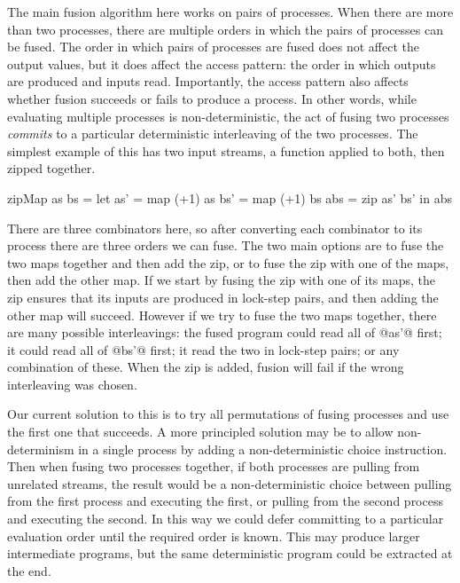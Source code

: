 The main fusion algorithm here works on pairs of processes.
When there are more than two processes, there are multiple orders in which the pairs of processes can be fused.
The order in which pairs of processes are fused does not affect the output values, but it does affect the access pattern: the order in which outputs are produced and inputs read.
Importantly, the access pattern also affects whether fusion succeeds or fails to produce a process.
In other words, while evaluating multiple processes is non-deterministic, the act of fusing two processes \emph{commits} to a particular deterministic interleaving of the two processes.
The simplest example of this has two input streams, a function applied to both, then zipped together. 

\begin{code}
zipMap as bs =
  let as' = map (+1) as
      bs' = map (+1) bs
      abs = zip as' bs'
  in  abs
\end{code}

There are three combinators here, so after converting each combinator to its process there are three orders we can fuse.
The two main options are to fuse the two maps together and then add the zip, or to fuse the zip with one of the maps, then add the other map.
If we start by fusing the zip with one of its maps, the zip ensures that its inputs are produced in lock-step pairs, and then adding the other map will succeed.
However if we try to fuse the two maps together, there are many possible interleavings: the fused program could read all of @as'@ first; it could read all of @bs'@ first; it read the two in lock-step pairs; or any combination of these.
When the zip is added, fusion will fail if the wrong interleaving was chosen.

% 

Our current solution to this is to try all permutations of fusing processes and use the first one that succeeds.
A more principled solution may be to allow non-determinism in a single process by adding a non-deterministic choice instruction.
Then when fusing two processes together, if both processes are pulling from unrelated streams, the result would be a non-deterministic choice between pulling from the first process and executing the first, or pulling from the second process and executing the second.
In this way we could defer committing to a particular evaluation order until the required order is known.
This may produce larger intermediate programs, but the same deterministic program could be extracted at the end.

